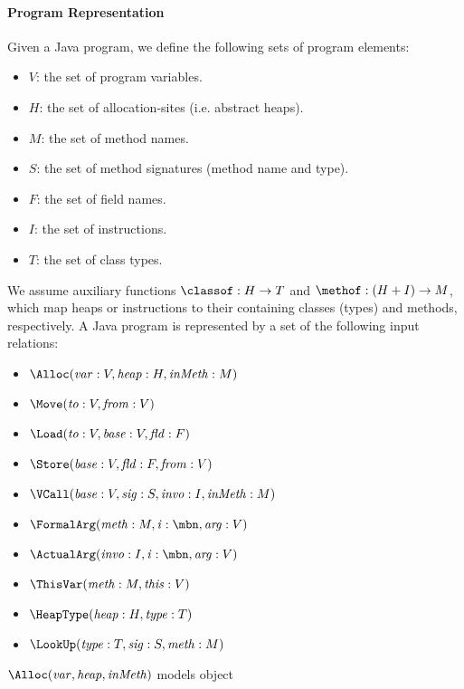 {\paragraph{Program Representation}
Given a Java program, we define the following sets of program elements: 
\begin{itemize}
\item $V$: the set of program variables. 
\item $H$: the set of allocation-sites (i.e. abstract heaps).
\item $M$: the set of method names.
\item $S$: the set of method signatures (method name and type).
\item $F$: the set of field names.
\item $I$: the set of instructions.
\item $T$: the set of class types.
\end{itemize}
We assume auxiliary functions $\classof: H \to T$ and $\methof: (H+I) \to M$, which map heaps or instructions to their
containing classes (types) and methods, respectively.  A Java program is represented
by a set of the following input relations:
\begin{itemize}
\item $\Alloc ({\it var}: V, {\it heap}: H, {\it inMeth}: M)$
\item $\Move ({\it to}: V, {\it from}: V)$
\item $\Load ({\it to}: V, {\it base}: V, {\it fld}: F)$
\item $\Store ({\it base}: V, {\it fld}: F, {\it from}: V)$
\item
  $\VCall ({\it base}: V, {\it sig}: S, {\it invo}: I, {\it inMeth}:
  M)$
\item $\FormalArg ({\it meth}: M, {\it i}: \mbn, {\it arg}: V)$
\item $\ActualArg ({\it invo}: I, {\it i}: \mbn, {\it arg}: V)$
\item $\ThisVar ({\it meth}: M, {\it this}: V)$
\item $\HeapType ({\it heap}: H, {\it type}: T)$
\item $\LookUp ({\it type}: T, {\it sig}: S, {\it meth}: M)$
\end{itemize}
$\Alloc ({\it var}, {\it heap}, {\it inMeth})$ models object
}
